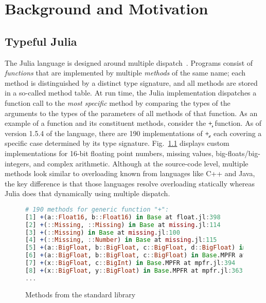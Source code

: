 
\chapter{Background and Motivation}
\label{chap:back}

\section{Typeful Julia}%
\label{sec:julia-back}

The Julia language is designed around multiple dispatch~\cite{BezansonEKS17}.
Programs consist of \emph{functions} that are implemented by multiple
\emph{methods} of the same name; each method is distinguished by a distinct type
signature, and all methods are stored in a so-called method table.
At run time, the Julia implementation dispatches a function call to
the \emph{most specific} method by comparing the types of the arguments to the
types of the parameters of all methods of that function. As an example of a
function and its constituent methods, consider the \c{+} function. As of version 1.5.4 of the
language, there are 190 implementations of \c{+}, each covering a
specific case determined by its type signature. Fig.~\ref{plus} displays custom
implementations for 16-bit floating point numbers, missing values,
big-floats/big-integers, and complex arithmetic.
Although at the source-code level, multiple methods look similar to
overloading known from languages like C++ and Java, the key difference is that
those languages resolve overloading statically whereas Julia does that
dynamically using multiple dispatch.

\begin{figure}
\begin{lstlisting}[language=julia]
# 190 methods for generic function "+":
[1] +(a::Float16, b::Float16) in Base at float.jl:398
[2] +(::Missing, ::Missing) in Base at missing.jl:114
[3] +(::Missing) in Base at missing.jl:100
[4] +(::Missing, ::Number) in Base at missing.jl:115
[5] +(a::BigFloat, b::BigFloat, c::BigFloat, d::BigFloat) in Base.MPFR at mpfr.jl:541
[6] +(a::BigFloat, b::BigFloat, c::BigFloat) in Base.MPFR at mpfr.jl:535
[7] +(x::BigFloat, c::BigInt) in Base.MPFR at mpfr.jl:394
[8] +(x::BigFloat, y::BigFloat) in Base.MPFR at mpfr.jl:363
...
\end{lstlisting}
\caption{Methods from the standard library}\label{plus}
\end{figure}

